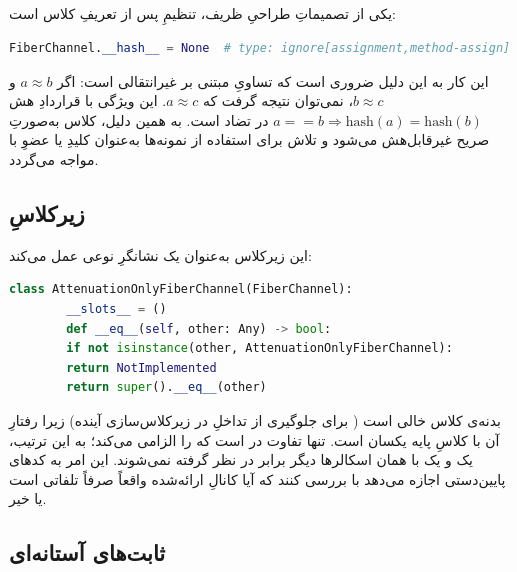 \subsection{}

یکی از تصمیماتِ طراحیِ ظریف، تنظیمِ  پس از تعریفِ کلاس است:
\begin{LTR}
	\begin{lstlisting}[language=Python]
		FiberChannel.__hash__ = None  # type: ignore[assignment,method-assign]
	\end{lstlisting}
\end{LTR}
این کار به این دلیل ضروری است که تساویِ مبتنی بر  غیرانتقالی است: اگر $a \approx b$ و $b \approx c$، نمی‌توان نتیجه گرفت که $a \approx c$. این ویژگی با قراردادِ هش $a == b \Rightarrow \text{hash}(a) = \text{hash}(b)$ در تضاد است. به همین دلیل، کلاس به‌صورتِ صریح غیرقابل‌هش  می‌شود و تلاش برای استفاده از نمونه‌ها به‌عنوان کلیدِ  یا عضوِ  با  مواجه می‌گردد.

\subsection{زیرکلاسِ }

این زیرکلاس به‌عنوان یک نشانگرِ نوعی  عمل می‌کند:
\begin{LTR}
	\begin{lstlisting}[language=Python]
		class AttenuationOnlyFiberChannel(FiberChannel):
		__slots__ = ()
		def __eq__(self, other: Any) -> bool:
		if not isinstance(other, AttenuationOnlyFiberChannel):
		return NotImplemented
		return super().__eq__(other)
	\end{lstlisting}
\end{LTR}
بدنه‌ی کلاس خالی است ( برای جلوگیری از تداخلِ  در زیرکلاس‌سازی آینده) زیرا رفتارِ آن با کلاسِ پایه یکسان است. تنها تفاوت در  است که  را الزامی می‌کند؛ به این ترتیب، یک  و یک  با همان اسکالرها دیگر برابر در نظر گرفته نمی‌شوند. این امر به کدهای پایین‌دستی اجازه می‌دهد با  بررسی کنند که آیا کانالِ ارائه‌شده واقعاً صرفاً تلفاتی است یا خیر.

\subsection{ثابت‌های آستانه‌ای}

